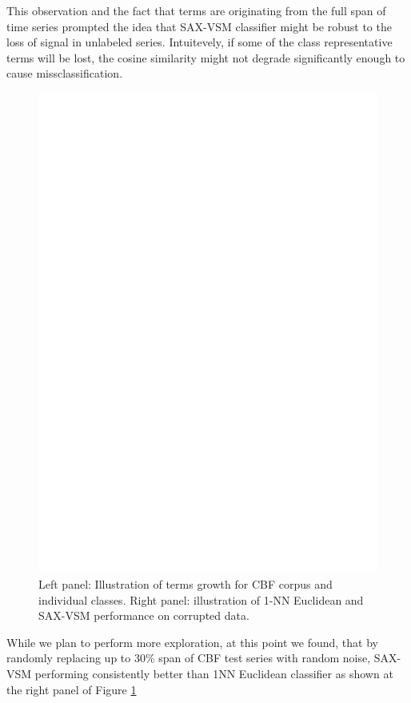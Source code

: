 \documentclass{llncs}
\begin{document}
This observation and the fact that terms are originating from the full span of time series prompted
the idea that SAX-VSM classifier might be robust to the loss of signal in unlabeled
series. Intuitevely, if some of the class representative terms will be lost, the cosine
similarity might not degrade significantly enough to cause missclassification.

\begin{figure}[t]
   \centering
   \includegraphics[width=120mm]{figures/corrupted.ps}
   \caption{Left panel: Illustration of terms growth for CBF corpus and individual classes.
Right panel: illustration of 1-NN Euclidean and SAX-VSM performance on corrupted data.}
   \label{fig:corrupted}
\end{figure}

While we plan to perform more exploration, at this point we found, that by randomly replacing up
to 30\% span of CBF test series with random noise, SAX-VSM performing consistently better
than 1NN Euclidean classifier as shown at the right panel of Figure \ref{fig:corrupted}
\end{document}
